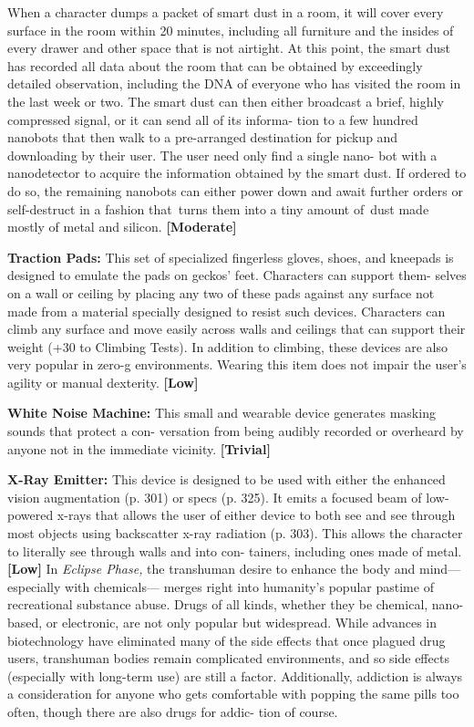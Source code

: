 When a character dumps a packet of smart dust in 
a room, it will cover every surface in the room within 
20 minutes, including all furniture and the insides 
of every drawer and other space that is not airtight. 
At this point, the smart dust has recorded all data 
about the room that can be obtained by exceedingly 
detailed observation, including the DNA of everyone 
who has visited the room in the last week or two. The 
smart dust can then either broadcast a brief, highly 
compressed signal, or it can send all of its informa-
tion to a few hundred nanobots that then walk to a 
pre-arranged destination for pickup and downloading 
by their user. The user need only find a single nano-
bot with a nanodetector to acquire the information 
obtained by the smart dust. If ordered to do so, the 
remaining nanobots can either power down and await 
further orders or self-destruct in a fashion that turns 
them into a tiny amount of dust made mostly of metal 
and silicon. \textbf{[Moderate]}

\textbf{Traction Pads:} This set of specialized fingerless 
gloves, shoes, and kneepads is designed to emulate the 
pads on geckos' feet. Characters can support them-
selves on a wall or ceiling by placing any two of these 
pads against any surface not made from a material 
specially designed to resist such devices. Characters 
can climb any surface and move easily across walls 
and ceilings that can support their weight (+30 to 
Climbing Tests). In addition to climbing, these devices 
are also very popular in zero-g environments. Wearing 
this item does not impair the user's agility or manual 
dexterity. \textbf{[Low]}

\textbf{White Noise Machine:} This small and wearable 
device generates masking sounds that protect a con-
versation from being audibly recorded or overheard 
by anyone not in the immediate vicinity. \textbf{[Trivial]}

\textbf{X-Ray Emitter:} This device is designed to be used 
with either the enhanced vision augmentation (p. 
301) or specs (p. 325). It emits a focused beam of 
low-powered x-rays that allows the user of either 
device to both see and see through most objects using 
backscatter x-ray radiation (p. 303). This allows the 
character to literally see through walls and into con-
tainers, including ones made of metal. \textbf{[Low]}
In \textit{Eclipse Phase,} the transhuman desire to enhance 
the body and mind—especially with chemicals—
merges right into humanity's popular pastime of 
recreational substance abuse. Drugs of all kinds, 
whether they be chemical, nano-based, or electronic, 
are not only popular but widespread. While advances 
in biotechnology have eliminated many of the side 
effects that once plagued drug users, transhuman 
bodies remain complicated environments, and so side 
effects (especially with long-term use) are still a factor. 
Additionally, addiction is always a consideration for 
anyone who gets comfortable with popping the same 
pills too often, though there are also drugs for addic-
tion of course.

